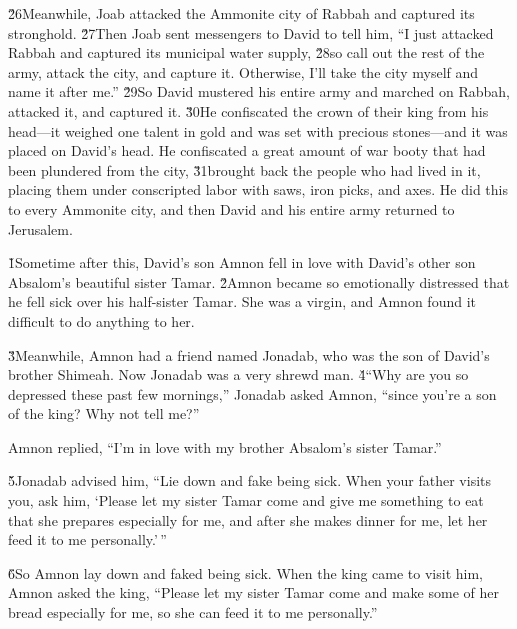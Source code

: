 \v{26}Meanwhile, Joab attacked the Ammonite city of Rabbah and captured its stronghold. \v{27}Then Joab sent messengers to David to tell him, ``I just attacked Rabbah and captured its municipal water supply, \v{28}so call out the rest of the army, attack the city, and capture it. Otherwise, I'll take the city myself and name it after me.'' \v{29}So David mustered his entire army and marched on Rabbah, attacked it, and captured it. \v{30}He confiscated the crown of their king from his head---it weighed one talent in gold and was set with precious stones---and it was placed on David's head. He confiscated a great amount of war booty that had been plundered from the city, \v{31}brought back the people who had lived in it, placing them under conscripted labor with saws, iron picks, and axes. He did this to every Ammonite city, and then David and his entire army returned to Jerusalem.

\v{1}Sometime after this, David's son Amnon fell in love with David's other son Absalom's beautiful sister Tamar. \v{2}Amnon became so emotionally distressed that he fell sick over his half-sister Tamar. She was a virgin, and Amnon found it difficult to do anything to her.

\v{3}Meanwhile, Amnon had a friend named Jonadab, who was the son of David's brother Shimeah. Now Jonadab was a very shrewd man. \v{4}``Why are you so depressed these past few mornings,'' Jonadab asked Amnon, ``since you're a son of the king? Why not tell me?''

Amnon replied, ``I'm in love with my brother Absalom's sister Tamar.''

\v{5}Jonadab advised him, ``Lie down and fake being sick. When your father visits you, ask him, `Please let my sister Tamar come and give me something to eat that she prepares especially for me, and after she makes dinner for me, let her feed it to me personally.'\,''

\v{6}So Amnon lay down and faked being sick. When the king came to visit him, Amnon asked the king, ``Please let my sister Tamar come and make some of her bread especially for me, so she can feed it to me personally.''

